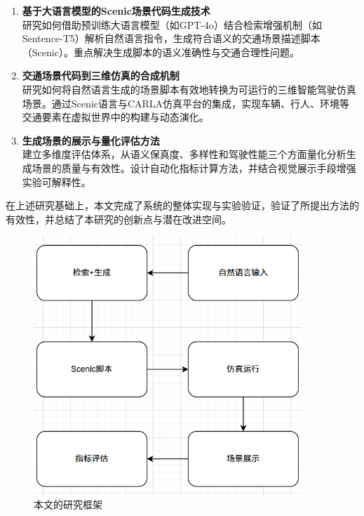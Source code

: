 \begin{enumerate}
	\item \textbf{基于大语言模型的Scenic场景代码生成技术} \\
	研究如何借助预训练大语言模型（如GPT-4o）结合检索增强机制（如Sentence-T5）解析自然语言指令，生成符合语义的交通场景描述脚本（Scenic）。重点解决生成脚本的语义准确性与交通合理性问题。
	
	\item \textbf{交通场景代码到三维仿真的合成机制} \\
	研究如何将自然语言生成的场景脚本有效地转换为可运行的三维智能驾驶仿真场景。通过Scenic语言与CARLA仿真平台的集成，实现车辆、行人、环境等交通要素在虚拟世界中的构建与动态演化。
	
	\item \textbf{生成场景的展示与量化评估方法} \\
	建立多维度评估体系，从语义保真度、多样性和驾驶性能三个方面量化分析生成场景的质量与有效性。设计自动化指标计算方法，并结合视觉展示手段增强实验可解释性。
\end{enumerate}

在上述研究基础上，本文完成了系统的整体实现与实验验证，验证了所提出方法的有效性，并总结了本研究的创新点与潜在改进空间。

\begin{figure}[H]
	\centering
	\includegraphics[width=0.9\textwidth]{../images/研究架构图.png} 
	\caption{本文的研究框架}
	\label{fig:research_framework}
\end{figure}